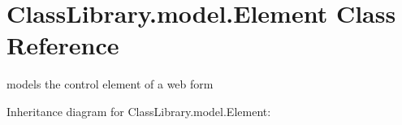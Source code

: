 \hypertarget{class_class_library_1_1model_1_1_element}{}\section{Class\+Library.\+model.\+Element Class Reference}
\label{class_class_library_1_1model_1_1_element}


models the control element of a web form  




Inheritance diagram for Class\+Library.\+model.\+Element\+:

